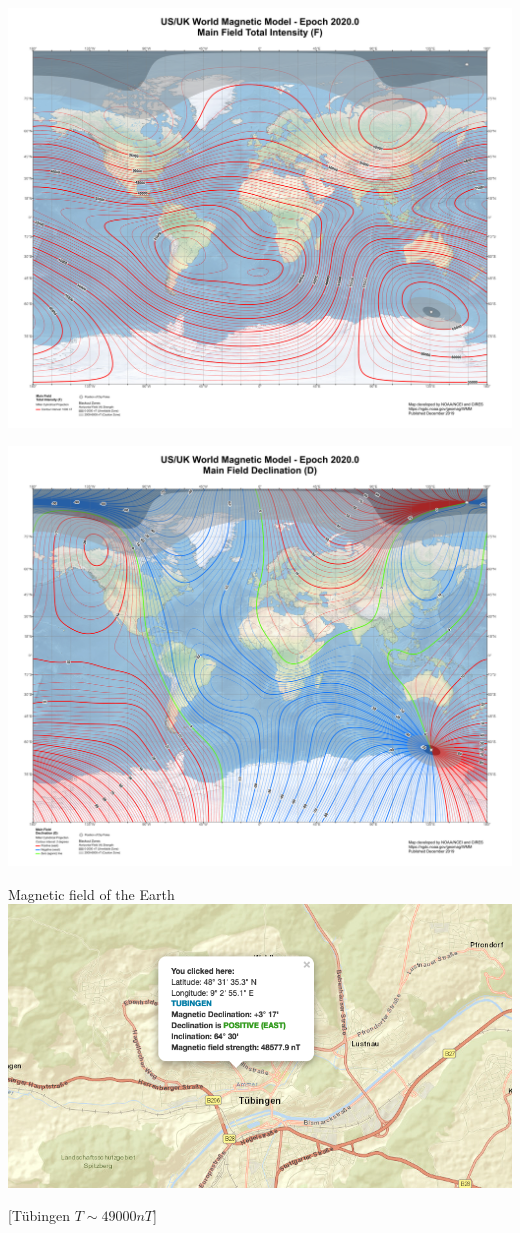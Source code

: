     \begin{frame}
      
        \includegraphics[width=0.75\linewidth]{Figures/Magnetics/WMM2020_F_BoZ_MILL.pdf}

    
    \end{frame}

    \begin{frame}
        \includegraphics[width=0.75\linewidth]{Figures/Magnetics/WMM2020_D_BoZ_MILL.pdf}
    \end{frame}

    \begin{frame}
      \begin{PointSix}{Magnetic field of the Earth}
        \includegraphics[width=0.99\linewidth]{Figures/Magnetics/MagnticFieldTuebingen.png}

        [Tübingen $T \sim 49 000 nT$]
      \end{PointSix}
    \end{frame}

